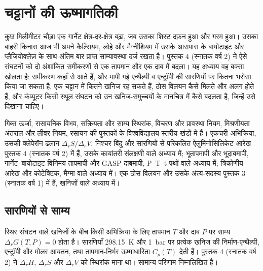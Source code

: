 \chapter{चट्टानों की ऊष्मागतिकी}\label{ch:b3:petrological-thermodynamics}

कुछ मिलीमीटर चौड़ा एक गार्नेट क्षेत्र-दर-क्षेत्र बढ़ा, जब उसका शिस्ट दफ़न हुआ
और गरम हुआ। उसका बाहरी किनारा आज भी अपने कैल्सियम, लोहे और मैग्नीशियम में
उसके आसपास के बायोटाइट और प्लैजियोक्लेज़ के साथ अंतिम बार प्राप्त साम्यावस्था दर्ज रखता है।
पुस्तक 4 (स्नातक वर्ष 2) ने ऐसे संघटनों को दो अंशांकित समीकरणों से एक तापमान और एक दाब में बदला।
यह अध्याय वह बक्सा खोलता है: समीकरण कहाँ से आते हैं,
और मापी गई एन्थैल्पी व एन्ट्रॉपी की सारणियों पर कितना भरोसा किया जा सकता है,
एक चट्टान में कितने खनिज रह सकते हैं, ठोस विलयन कैसे मिलते और अलग होते हैं,
और कंप्यूटर किसी स्थूल संघटन को उन खनिज-समुच्चयों के मानचित्र में कैसे बदलता है,
जिन्हें उसे दिखाना चाहिए।

\begin{recall}
गिब्स ऊर्जा, रासायनिक विभव, सक्रियता और साम्य स्थिरांक,
विचरण और प्रावस्था नियम, मिश्रणीयता अंतराल और लीवर नियम,
रसायन की पुस्तकों के विश्वविद्यालय-स्तरीय खंडों में हैं। एकचरी अभिक्रिया, उसकी
क्लेपेरॉन ढलान $\Delta_rS/\Delta_rV$, निश्चर बिंदु और
सारणियों से परिकलित ऐलुमिनोसिलिकेट आरेख पुस्तक 4 (स्नातक वर्ष 2) में हैं, उसके
कायांतरी संलक्षणी वाले अध्याय में; भूतापमापी और भूदाबमापी,
गार्नेट--बायोटाइट विनिमय तापमापी और GASP दाबमापी, P--T--t पथों वाले अध्याय में;
त्रिकोणीय आरेख और कोटेक्टिक, मैग्मा वाले अध्याय में। एक ठोस
विलयन और उसके अंत्य-सदस्य पुस्तक 3 (स्नातक वर्ष 1) में हैं, खनिजों वाले
अध्याय में।
\end{recall}

\section{सारणियों से साम्य}\label{sec:b3:petrological-thermodynamics:tables}

स्थिर संघटन वाले खनिजों के बीच किसी अभिक्रिया के लिए तापमान
$T$ और दाब $P$ पर साम्य $\Delta_rG(T, P) = 0$ होता है। सारणियाँ
\qty{298.15}{K} और \qty{1}{bar} पर प्रत्येक खनिज की निर्माण-एन्थैल्पी, एन्ट्रॉपी
और मोलर आयतन, तथा तापमान-निर्भर ऊष्माधारिता $C_p(T)$ देती हैं।
पुस्तक 4 (स्नातक वर्ष 2) ने $\Delta_rH$, $\Delta_rS$ और $\Delta_rV$ को स्थिरांक माना था।
सामान्य परिणाम निम्नलिखित है।

